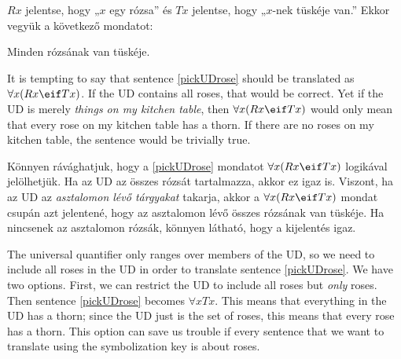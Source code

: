 $Rx$ jelentse, hogy „$x$ egy rózsa” és $Tx$ jelentse, hogy „$x$-nek tüskéje van.” Ekkor vegyük a következő mondatot:
\begin{earg}
\item[\ex{pickUDrose}] Minden rózsának van tüskéje.
\end{earg}

It is tempting to say that sentence \ref{pickUDrose} should be translated as $\forall x(Rx \eif Tx)$. If the UD contains all roses, that would be correct. Yet if the UD is merely \emph{things on my kitchen table}, then $\forall x(Rx \eif Tx)$ would only mean that every rose on my kitchen table has a thorn. If there are no roses on my kitchen table, the sentence would be trivially true.

Könnyen rávághatjuk, hogy a \ref{pickUDrose} mondatot $\forall x(Rx \eif Tx)$ logikával jelölhetjük. Ha az UD az összes rózsát tartalmazza, akkor ez igaz is. Viszont, ha az UD az \emph{asztalomon lévő tárgyakat} takarja, akkor a $\forall x(Rx \eif Tx)$ mondat csupán azt jelentené, hogy az asztalomon lévő összes rózsának van tüskéje. Ha nincsenek az asztalomon rózsák, könnyen látható, hogy a kijelentés igaz.






The universal quantifier only ranges over members of the UD, so we need to include all roses in the UD in order to translate sentence \ref{pickUDrose}. We have two options. First, we can restrict the UD to include all roses but \emph{only} roses. Then sentence \ref{pickUDrose} becomes $\forall x Tx$. This means that everything in the UD has a thorn; since the UD just is the set of roses, this means that every rose has a thorn. This option can save us trouble if every sentence that we want to translate using the symbolization key is about roses.

